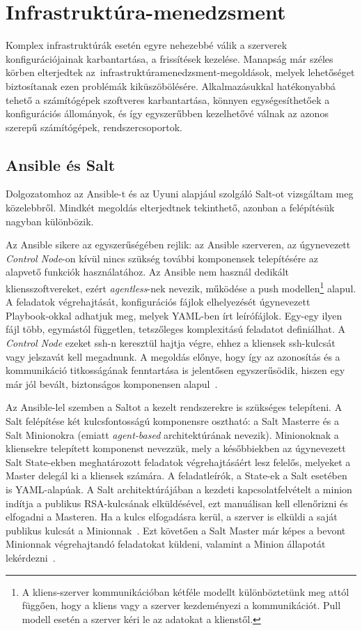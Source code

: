 \section{Infrastruktúra-menedzsment}
Komplex infrastruktúrák esetén egyre nehezebbé válik a szerverek konfigurációjainak karbantartása, a frissítések kezelése. Manapság már széles körben elterjedtek az~infrastruktúramenedzsment-megoldások, melyek lehetőséget biztosítanak ezen problémák kiküszöbölésére. Alkalmazásukkal hatékonyabbá tehető a számítógépek szoftveres karbantartása, könnyen egységesíthetőek a konfigurációs állományok, és így egyszerűbben kezelhetővé válnak az azonos szerepű számítógépek, rendszercsoportok.

\subsection{Ansible és Salt}
Dolgozatomhoz az Ansible-t és az Uyuni alapjául szolgáló Salt-ot vizsgáltam meg közelebbről. Mindkét megoldás elterjedtnek tekinthető, azonban a felépítésük nagyban különbözik.

Az Ansible sikere az egyszerűségében rejlik: az Ansible szerveren, az úgynevezett \textit{Control Node}-on kívül nincs szükség további komponensek telepítésére az alapvető funkciók használatához. Az Ansible nem használ dedikált kliensszoftvereket, ezért \textit{agentless}-nek nevezik, működése a push modellen\footnote{A kliens-szerver kommunikációban kétféle modellt különböztetünk meg attól függően, hogy a kliens vagy a szerver kezdeményezi a kommunikációt. Pull modell esetén a szerver kéri le az adatokat a klienstől.} alapul. A feladatok végrehajtását, konfigurációs fájlok elhelyezését úgynevezett Playbook-okkal adhatjuk meg, melyek YAML-ben írt leírófájlok. Egy-egy ilyen fájl több, egymástól független, tetszőleges komplexitású feladatot definiálhat. A \textit{Control Node} ezeket \acrshort{ssh}-n keresztül hajtja végre, ehhez a kliensek \acrshort{ssh}-kulcsát vagy jelszavát kell megadnunk. A megoldás előnye, hogy így az azonosítás és a kommunikáció titkosságának fenntartása is jelentősen egyszerűsödik, hiszen egy már jól bevált, biztonságos komponensen alapul~\cite{RedHatAnsibleVsSalt}.

Az Ansible-lel szemben a Saltot a kezelt rendszerekre is szükséges telepíteni. A Salt felépítése két kulcsfontosságú komponensre osztható: a Salt Masterre és a Salt Minionokra (emiatt \textit{agent-based} architektúrának nevezik). Minionoknak a kliensekre telepített komponenst nevezzük, mely a későbbiekben az úgynevezett Salt State-ekben meghatározott feladatok végrehajtásáért lesz felelős, melyeket a Master delegál ki a kliensek számára. A feladatleírók, a State-ek a Salt esetében is YAML-alapúak. A Salt architektúrájában a kezdeti kapcsolatfelvételt a minion indítja a publikus RSA-kulcsának elküldésével, ezt manuálisan kell ellenőrizni és elfogadni a Masteren. Ha a kulcs elfogadásra kerül, a szerver is elküldi a saját publikus kulcsát a Minionnak~\cite{SaltSecurity}. Ezt követően a Salt Master már képes a bevont Minionnak végrehajtandó feladatokat küldeni, valamint a Minion állapotát lekérdezni~\cite{RedHatAnsibleVsSalt}.

